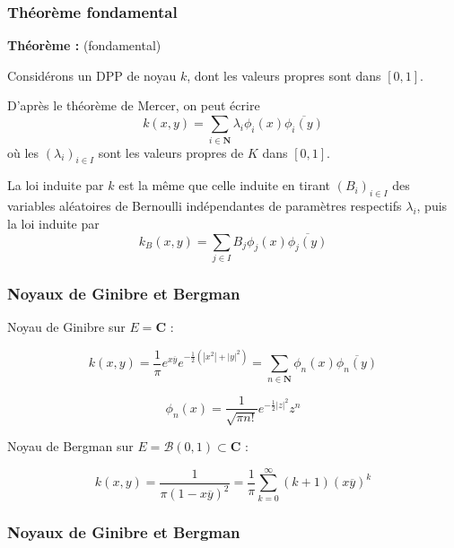 \documentclass[9pt]{beamer}
\begin{document}
\begin{frame}
\end{frame}\begin{frame}\frametitle{Théorème fondamental}

    \textbf{Théorème :} (fondamental)

    Considérons un DPP de noyau $k$, dont les valeurs propres sont dans $[0,1]$.

    D'après le théorème de Mercer, on peut écrire 
    \[ 
        k(x,y) = \sum_{i \in \mathbf N} \lambda_i \phi_i (x) \overline{\phi_i(y)}
    \] 
    où les $ (\lambda_i)_{i \in I} $ sont les valeurs propres de $K$ dans $[0,1]$.

    \bigskip

    La loi induite par $k$ est la même que celle induite en tirant $ (B_i)_{i \in I} $ des variables aléatoires de Bernoulli indépendantes de paramètres respectifs $ \lambda_i $, puis la loi induite par 
    \[
         k_B(x,y) = \sum_{j \in I} B_j \phi_j(x) \overline{\phi_j(y)}
    \]

\end{frame}\begin{frame}\frametitle{Noyaux de Ginibre et Bergman}

    \bigskip

    Noyau de Ginibre sur $ E = \mathbf C $ : 
    
    $$ k(x,y) = \frac 1 \pi e^{x \overline y} e^{- \frac 1 2 (|x^2| + |y|^2)} = \sum_{n \in \mathbf N} \phi_n(x) \overline{\phi_n(y)}$$

    $$ \phi_n(x) = \frac{1}{\sqrt{\pi n!}} e^{- \frac 1 2 |z|^2} z^n $$

    \bigskip

    Noyau de Bergman sur $ E = \mathcal B(0,1) \subset \mathbf C $ :

    $$ k(x,y) = \frac{1}{\pi(1-x\overline y)^2} = \frac 1 \pi \sum_{k=0}^\infty (k+1)(x \overline y)^k $$

\end{frame}\begin{frame}\frametitle{Noyaux de Ginibre et Bergman}

    \begin{center}


\end{center}
\end{frame}
\end{document}
